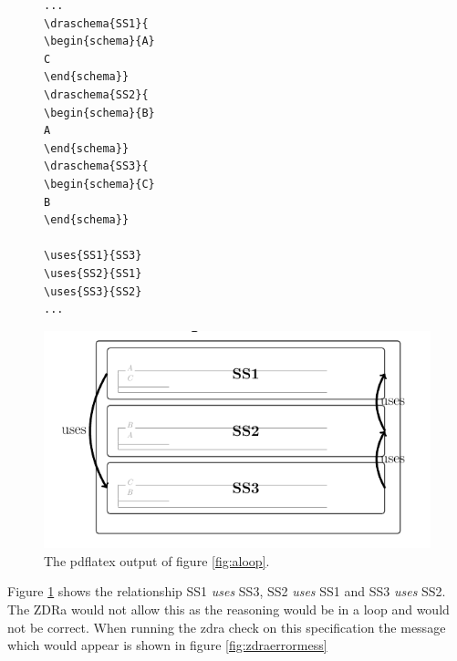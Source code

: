 \begin{figure}[H]
\vspace{-0.2in}
\centering
\begin{minipage}{0.45\textwidth}
\centering
\begin{scriptsize}
\begin{BVerbatim}
...
\draschema{SS1}{
\begin{schema}{A}
C
\end{schema}}
\draschema{SS2}{
\begin{schema}{B}
A
\end{schema}}
\draschema{SS3}{
\begin{schema}{C}
B
\end{schema}}

\uses{SS1}{SS3}
\uses{SS2}{SS1}
\uses{SS3}{SS2}
...
\end{BVerbatim}
\end{scriptsize}
\vspace{-0.18in}
\caption{An example of a loop in the reasoning in a labelled ZDRa specification.\label{fig:aloop}}
\vspace{-0.2in}
\end{minipage}\hfill
\begin{minipage}{0.45\textwidth}
\centering
\includegraphics[scale=0.33]{Figures/zdra/zdraloop.png}
\vspace{-0.18in}
\caption{The pdflatex output of figure \ref{fig:aloop}.  \label{fig:zdraerror1}}
\vspace{-0.2in}
\end{minipage}
\end{figure}

Figure \ref{fig:zdraerror1} shows the relationship SS1 \textit{uses} SS3, SS2 \textit{uses} SS1 and SS3 \textit{uses} SS2. The ZDRa would not allow this as the reasoning would be in a loop and would not be correct. When running the \gls{zdra} check on this specification the message which would appear is shown in figure \ref{fig:zdraerrormess}

